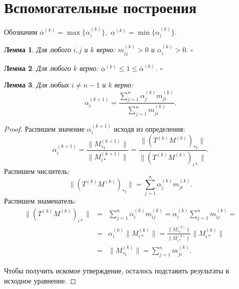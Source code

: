 \documentclass{article}
\newtheorem{lemma}{Лемма}
\newcommand{\Abs}[1]{\lVert{}#1{}\rVert}
\newcommand{\ak}[1][k]{\alpha^{(#1)}}
\newcommand{\minak}[1][k]{\underline{\alpha}^{(#1)}}
\newcommand{\maxak}[1][k]{\overline{\alpha}^{(#1)}}
\newcommand{\mk}[1][k]{m^{(#1)}}
\newcommand{\Mk}[1][k]{M^{(#1)}}
\newcommand{\Tk}[1][k]{T^{(#1)}}
\begin{document}
\section{Вспомогательные построения}

Обозначим $\maxak = \max \{ \ak_i \},$ $\minak = \min \{ \ak_i \}.$

\begin{lemma}
  \label{lemma:constraint}
  Для любого $i, j$ и $k$ верно: $\mk_{ij} > 0$ и $\ak_i > 0. $
  \hfill$\square$
\end{lemma}

\begin{lemma}
  \label{lemma:one}
  Для любого $k$ верно: $\minak \leq 1 \leq \maxak$.
  \hfill$\square$
\end{lemma}

\begin{lemma}
  \label{lemma:ak_next}
  Для любых $i \not= n - 1$ и $k$ верно:
  \[ \ak[k + 1]_i = \frac{\sum_{j = 1}^n{\ak_j\mk_{ji}}}{\sum_{j = 1}^n{\mk_{ji}}}. \]
\end{lemma}
\begin{proof}
  Распишем значение $\ak[k + 1]_i$ исходя из определения:
  \[ \ak[k + 1]_i = \frac{\Abs{\Mk[k + 1]_{*i}}}{\Abs{\Mk[k + 1]_{i*}}} = 
                    \frac{\Abs{(\Tk\Mk)_{*i}}}{\Abs{(\Tk\Mk)_{i*}}}.
  \]
  Распишем числитель:
  \[ \Abs{(\Tk\Mk)_{*i}} = \sum_{j = 1}^n{\ak_j\mk_{ji}}. \]
  Распишем знаменатель:
  \begin{eqnarray*}
    \Abs{(\Tk\Mk)_{i*}} & = & \sum_{j = 1}^n{\ak_i\mk_{ij}} = \ak_i \sum_{j = 1}^n{\mk_{ij}} = \\
                        & = & \ak_i \Abs{\Mk_{i*}} = \frac{\Abs{\Mk_{*i}}}{\Abs{\Mk_{i*}}} \Abs{\Mk_{i*}} \\
                        & = & \Abs{\Mk_{*i}} = \sum_{j = 1}^n{\mk_{ji}}. 
  \end{eqnarray*}

  Чтобы получить искомое утверждение, осталось подставить результаты в исходное уравнение.
\end{proof}
\end{document}
